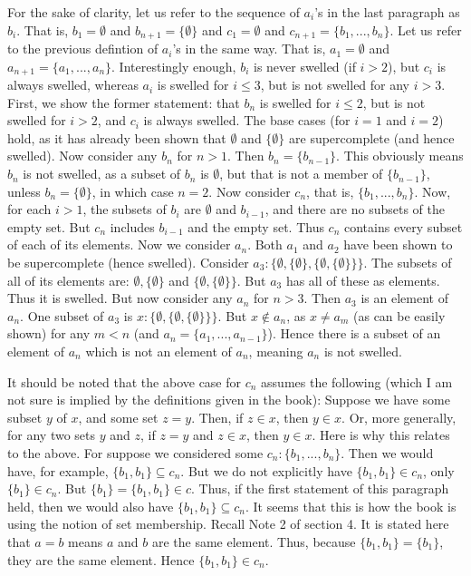 \documentclass{article}
\theoremstyle{definition}
\begin{document}
For the sake of clarity, let us refer to the sequence of $a_i$'s in the last paragraph as $b_i$. That is, $b_1=\emptyset$ and $b_{n+1}=\{\emptyset\}$ and $c_1=\emptyset$ and 
$c_{n+1}=\{b_1,...,b_n\}$. Let us refer to the previous defintion of 
$a_i$'s in the same way. That is, $a_1=\emptyset$ and $a_{n+1}=\{a_1,...,a_n\}$. Interestingly enough, $b_i$ is never swelled (if $i>2$), but $c_i$ is always swelled, 
whereas $a_i$ is swelled for $i\le 3$, but is not 
swelled for any $i>3$. First, we show the former statement: that $b_n$ is swelled for $i\le 2$, but is not swelled for $i>2$, and $c_i$ is always swelled. 
The base cases (for $i=1$ and $i=2$) hold, as it has already been shown that $\emptyset$ and $\{\emptyset\}$ are supercomplete (and hence swelled). Now consider any $b_n$ for $n>1$. 
Then $b_n=\{b_{n-1}\}$. This obviously means $b_n$ is not swelled, as a subset of $b_n$ is $\emptyset$, but that is not a member of $\{b_{n-1}\}$, unless $b_n=\{\emptyset\}$, in which case $n=2$. Now 
consider $c_n$, that is, $\{b_1,...,b_n\}$. Now, for each $i>1$, the subsets of $b_i$ are $\emptyset$ and $b_{i-1}$, and there are no subsets of the empty set. But $c_n$ includes $b_{i-1}$ and 
the empty set. Thus $c_n$ contains every subset of each of its elements. Now we consider $a_n$. Both $a_1$ and $a_2$ have been shown to be supercomplete (hence swelled). Consider 
$a_3: \{\emptyset,\{\emptyset\},\{\emptyset,\{\emptyset\}\}\}$. The subsets of all of its elements are: $\emptyset,\{\emptyset\}$ and $\{\emptyset,\{\emptyset\}\}$. But $a_3$ has all of these as 
elements. Thus it is swelled. But now consider any $a_n$ for $n>3$. Then $a_3$ is an element of $a_n$. One subset of 
$a_3$ is $x:\{\emptyset,\{\emptyset,\{\emptyset\}\}\}$. But $x\notin a_n$, as $x\ne a_m$ (as can be easily shown) for any $m<n$ (and $a_n=\{a_1,...,a_{n-1}\}$). Hence there is a subset of an 
element of $a_n$ which is not an element of $a_n$, meaning $a_n$ is not swelled. 


It should be noted that the above case for $c_n$ assumes the following (which I am not sure is implied by the definitions given in the book): Suppose we have some subset $y$ of $x$, and some 
set $z=y$. Then, if $z\in x$, then $y\in x$. Or, more generally, for any two sets $y$ and $z$, if $z=y$ and $z\in x$, then $y\in x$. Here is why this relates to the above. For suppose we considered 
some $c_n:\{b_1,...,b_n\}$. Then we would have, for example, $\{b_1,b_1\}\subseteq c_n$. But we do not explicitly have $\{b_1,b_1\}\in c_n$, only $\{b_1\}\in c_n$. But 
$\{b_1\}=\{b_1,b_1\}\in c$. Thus, if the first statement of this paragraph held, then we would also have $\{b_1,b_1\}\subseteq c_n$. It seems that this is how the book is using the notion of 
set membership. Recall Note 2 of section 4. It is stated here that $a=b$ means $a$ and $b$ are the same element. Thus, because $\{b_1,b_1\}=\{b_1\}$, they are the same element. Hence 
$\{b_1,b_1\}\in c_n$.
\end{document}
